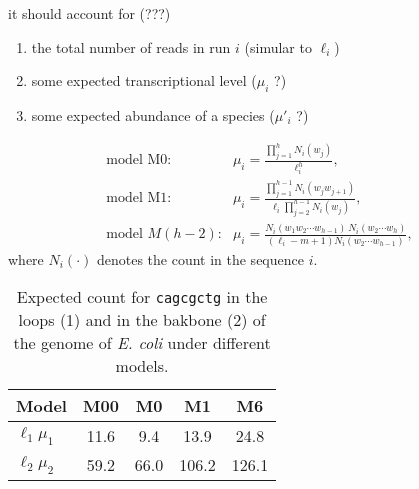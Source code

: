 \documentclass[dvips, lscape]{foils}
\newcommand{\textblue}[1]{\textcolor{blue}{#1}}
\newcommand{\paragraph}[1]{\noindent {\textblue{#1}}}
\begin{document}
\bigskip
\paragraph{For NGS counts} it should account for (???) 
\begin{enumerate}[($i$)]
\item the total number of reads in run $i$ (simular to $\ell_i$)
\item some expected transcriptional level ($\mu_i$ ?)
\item some expected abundance of a species ($\mu'_i$ ?)
\end{enumerate}

\newpage
\paragraph{Expected intensity.}
$$
\begin{array}{ll}
\text{model  M0:} & 
\displaystyle{\mu_i=\frac{\prod_{j=1}^{h}N_i(w_j)}{\ell_i^{h}}},\\
\text{model  M1:} & 
\displaystyle{\mu_i=\frac{\prod_{j=1}^{h-1}N_i(w_j w_{j+1})}
                        {\ell_i \prod_{j=2}^{h-1}N_i(w_j)}},\\
\text{model } M(h-2)\text{:} & 
\displaystyle{\mu_i=\frac{N_i(w_1 w_2 \cdots w_{h-1})\,N_i(w_2 \cdots w_h)}
                        {(\ell_i -m+1) N_i(w_2 \cdots w_{h-1})}},
\end{array}
$$
where $N_i(\cdot)$ denotes the count in the sequence $i$.

\bigskip
\begin{table}[h]
  \begin{center}
    \begin{tabular}{lcccc}
      Model          & M00 & M0 & M1 & M6  \\
      \hline
      $\ell_1 \mu_1$ & 11.6 & 9.4 & 13.9 & 24.8 \\
      $\ell_2 \mu_2$ & 59.2 & 66.0 & 106.2 & 126.1
    \end{tabular}
    \caption{Expected count for {\tt cagcgctg} in the loops (1) and in the
      bakbone (2) of the genome of {\it E. coli} under different
      models.}
    \label{Tab:EN-cagcgctg}
  \end{center}
\end{table}
\end{document}

